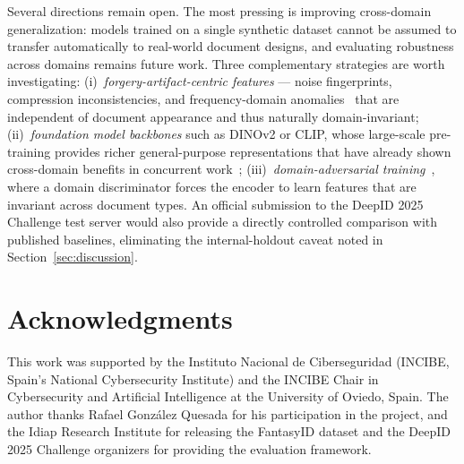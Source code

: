 Several directions remain open. The most pressing is improving
cross-domain generalization: models trained on a single synthetic
dataset cannot be assumed to transfer automatically to real-world document
designs, and evaluating robustness across domains remains future work.
Three complementary strategies are worth investigating:
(i)~\emph{forgery-artifact-centric features} --- noise fingerprints,
compression inconsistencies, and frequency-domain anomalies~\cite{noiseprint2020}
that are independent of document appearance and thus naturally domain-invariant;
(ii)~\emph{foundation model backbones} such as DINOv2 or CLIP, whose
large-scale pre-training provides richer general-purpose representations
that have already shown cross-domain benefits in concurrent
work~\cite{fakeidet2025};
(iii)~\emph{domain-adversarial training}~\cite{ganin2016dann}, where a
domain discriminator forces the encoder to learn features that are
invariant across document types.
An official submission to the DeepID 2025 Challenge test server would also
provide a directly controlled comparison with published baselines,
eliminating the internal-holdout caveat noted in Section~\ref{sec:discussion}.

\section*{Acknowledgments}
This work was supported by the Instituto Nacional de Ciberseguridad
(INCIBE, Spain's National Cybersecurity Institute) and the INCIBE Chair
in Cybersecurity and Artificial Intelligence at the University of Oviedo, Spain. The author thanks Rafael Gonz\'{a}lez Quesada for his
participation in the project, and the Idiap Research Institute for releasing the
FantasyID dataset and the DeepID 2025 Challenge organizers for providing the
evaluation framework.
